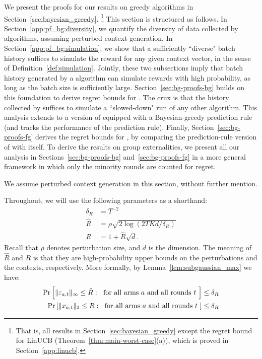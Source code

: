 We present the proofs for our results on greedy algorithms in Section~\ref{sec:bayesian_greedy}.%
\footnote{That is, all results in Section~\ref{sec:bayesian_greedy} except the regret bound for LinUCB (Theorem~\ref{thm:main-worst-case}(a)), which is proved in Section~\ref{app:linucb}.} This section is structured as follows. In Section~\ref{app:pf_bg:diversity}, we quantify the diversity of data collected by \GreedyStyle algorithms, assuming perturbed context generation. In Section~\ref{app:pf_bg:simulation}, we show that a sufficiently ``diverse" batch history suffices to simulate the reward for any given context vector, in the sense of Definition~\ref{def:simulation}. Jointly, these two subsections imply  that batch history generated by a \GreedyStyle algorithm can simulate rewards with high probability, as long as the batch size is sufficiently large. Section~\ref{sec:bg-proofs-bg} builds on this foundation to derive regret bounds for \bg. The crux is that the history collected by \bg suffices to simulate a ``slowed-down" run of any other algorithm. This analysis extends to a version of \fg equipped with a Bayesian-greedy prediction rule (and tracks the performance of the prediction rule). Finally, Section~\ref{sec:bg-proofs-fg} derives the regret bounds for \fg, by comparing the prediction-rule version of \fg with \fg itself. To derive the results on group externalities, we present all our analysis in Sections~\ref{sec:bg-proofs-bg} and~\ref{sec:bg-proofs-fg} in a more general framework in which only the minority rounds are counted for regret.

We assume perturbed context generation in this section, without further mention.

Throughout, we will use the following parameters as a shorthand:
\begin{align*}
\delta_R &= T^{-2} \\
\hat R  & = \rho\sqrt{2 \log(2 TKd/\delta_R)} \\
R   &= 1 + \hat{R} \sqrt{d}.
\end{align*}
Recall that $\rho$ denotes perturbation size, and $d$ is the dimension. The meaning of $\hat R$ and $R$ is that they are high-probability upper bounds on the perturbations and the contexts, respectively. More formally, by Lemma~\ref{lem:subgaussian_max} we have:
\begin{align}
\Pr\left[ \|\varepsilon_{a,t}\|_\infty \leq \hat R:\;
    \text{ for all arms $a$ and all rounds $t$ } \right] &\leq \delta_R
    \label{eq:bg-proofs-highprob-R-hat}\\
\Pr\left[ \|x_{a,t}\|_2 \leq R:\;
    \text{ for all arms $a$ and all rounds $t$ } \right] &\leq \delta_R
    \label{eq:bg-proofs-highprob-R}
\end{align}



